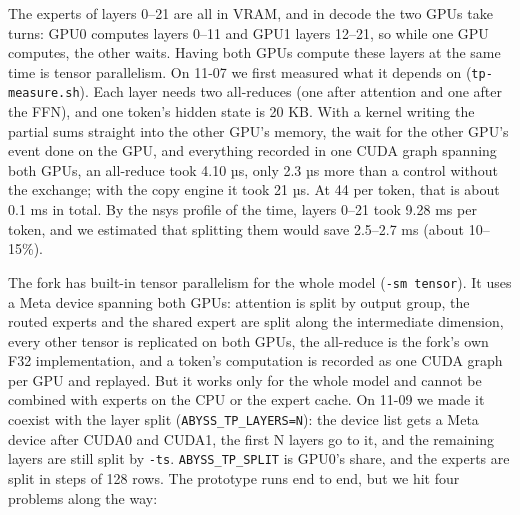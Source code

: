 \documentclass[11pt,a4paper]{article}
\newcommand{\code}[1]{\texttt{#1}}
\begin{document}
The experts of layers 0--21 are all in VRAM, and in decode the two GPUs take turns: GPU0 computes layers 0--11 and GPU1 layers 12--21, so while one GPU computes, the other waits. Having both GPUs compute these layers at the same time is tensor parallelism. On 11-07 we first measured what it depends on (\code{tp-measure.sh}). Each layer needs two all-reduces (one after attention and one after the FFN), and one token's hidden state is 20 KB. With a kernel writing the partial sums straight into the other GPU's memory, the wait for the other GPU's event done on the GPU, and everything recorded in one CUDA graph spanning both GPUs, an all-reduce took 4.10 µs, only 2.3 µs more than a control without the exchange; with the copy engine it took 21 µs. At 44 per token, that is about 0.1 ms in total. By the nsys profile of the time, layers 0--21 took 9.28 ms per token, and we estimated that splitting them would save 2.5--2.7 ms (about 10--15\%).

The fork has built-in tensor parallelism for the whole model (\code{-sm tensor}). It uses a Meta device spanning both GPUs: attention is split by output group, the routed experts and the shared expert are split along the intermediate dimension, every other tensor is replicated on both GPUs, the all-reduce is the fork's own F32 implementation, and a token's computation is recorded as one CUDA graph per GPU and replayed. But it works only for the whole model and cannot be combined with experts on the CPU or the expert cache. On 11-09 we made it coexist with the layer split (\code{ABYSS\_TP\_LAYERS=N}): the device list gets a Meta device after CUDA0 and CUDA1, the first N layers go to it, and the remaining layers are still split by \code{-ts}. \code{ABYSS\_TP\_SPLIT} is GPU0's share, and the experts are split in steps of 128 rows. The prototype runs end to end, but we hit four problems along the way:
\end{document}
